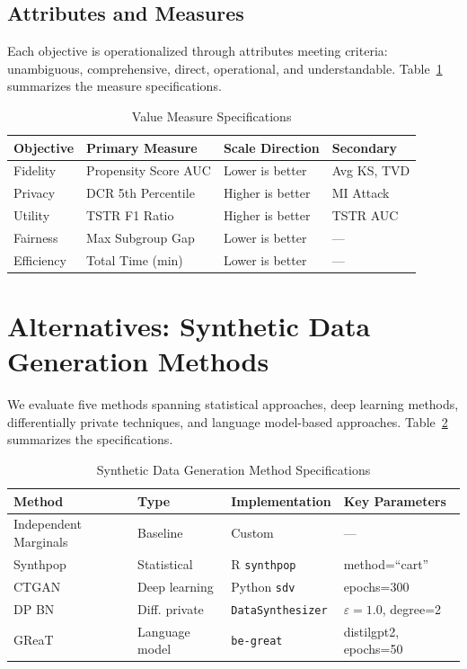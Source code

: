 \documentclass[12pt,a4paper]{article}
\begin{document}
\subsection{Attributes and Measures}

Each objective is operationalized through attributes meeting \citet{keeney2005selecting} criteria: unambiguous, comprehensive, direct, operational, and understandable. Table~\ref{tab:measures} summarizes the measure specifications.

\begin{table}[htbp]
\centering
\caption{Value Measure Specifications}
\label{tab:measures}
\begin{tabular}{@{}llll@{}}
\toprule
\textbf{Objective} & \textbf{Primary Measure} & \textbf{Scale Direction} & \textbf{Secondary} \\
\midrule
Fidelity & Propensity Score AUC & Lower is better & Avg KS, TVD \\
Privacy & DCR 5th Percentile & Higher is better & MI Attack \\
Utility & TSTR F1 Ratio & Higher is better & TSTR AUC \\
Fairness & Max Subgroup Gap & Lower is better & --- \\
Efficiency & Total Time (min) & Lower is better & --- \\
\bottomrule
\end{tabular}
\end{table}

\section{Alternatives: Synthetic Data Generation Methods}

We evaluate five methods spanning statistical approaches, deep learning methods, differentially private techniques, and language model-based approaches. Table~\ref{tab:methods} summarizes the specifications.

\begin{table}[htbp]
\centering
\caption{Synthetic Data Generation Method Specifications}
\label{tab:methods}
\begin{tabular}{@{}llll@{}}
\toprule
\textbf{Method} & \textbf{Type} & \textbf{Implementation} & \textbf{Key Parameters} \\
\midrule
Independent Marginals & Baseline & Custom & --- \\
Synthpop & Statistical & R \texttt{synthpop} & method=``cart'' \\
CTGAN & Deep learning & Python \texttt{sdv} & epochs=300 \\
DP BN & Diff. private & \texttt{DataSynthesizer} & $\varepsilon=1.0$, degree=2 \\
GReaT & Language model & \texttt{be-great} & distilgpt2, epochs=50 \\
\bottomrule
\end{tabular}
\end{table}
\end{document}
